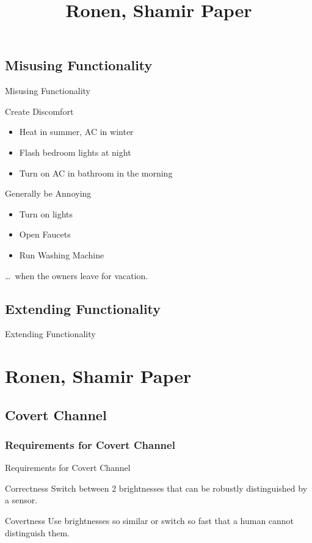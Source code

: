\documentclass[11pt,t,usepdftitle=false,aspectratio=169]{beamer}
\begin{document}
\subsection{Misusing Functionality}
\begin{frame}{Misusing Functionality}
	\begin{block}{Create Discomfort}
		\begin{itemize}
			\item Heat in summer, AC in winter
			\item Flash bedroom lights at night
			\item Turn on AC in bathroom in the morning
		\end{itemize}
	\end{block}
	\begin{block}{Generally be Annoying}
		\begin{itemize}
			\item Turn on lights
			\item Open Faucets
			\item Run Washing Machine
		\end{itemize}
		\dots~when the owners leave for vacation.
	\end{block}
\end{frame}

\subsection{Extending Functionality}

\begin{frame}{Extending Functionality}

\end{frame}

\title{Ronen, Shamir Paper}
\subtitle{}
\section{Ronen, Shamir Paper}

\subsection{Covert Channel}%
\label{sub:covert_channel}

\subsubsection{Requirements for Covert Channel}%
\label{sub:requirements_for_covert_channel}
\begin{frame}{Requirements for Covert Channel}
	\begin{block}{Correctness}
		Switch between 2 brightnesses that can be robustly distinguished by a sensor.
	\end{block}
	\begin{block}{Covertness}
		Use brightnesses so similar or switch so fast that a human cannot distinguish them.
	\end{block}
\end{frame}
\end{document}
